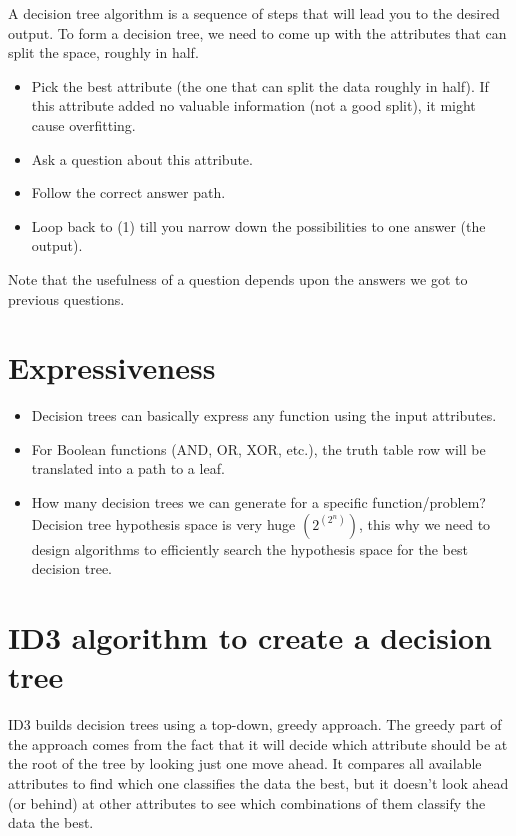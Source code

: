 \documentclass[12pt]{report}
\begin{document}
A decision tree algorithm is a sequence of steps that will lead you to the desired output. To form a decision tree, we need to come up with the attributes that can split the space, roughly in half. 
\begin{itemize}
\item Pick the best attribute (the one that can split the data roughly in half). If this attribute added no valuable information (not a good split), it might cause overfitting.
\item Ask a question about this attribute.
\item Follow the correct answer path.
\item Loop back to (1) till you narrow down the possibilities to one answer (the output).
\end{itemize}
Note that the usefulness of a question depends upon the answers we got to previous questions.



\section{Expressiveness}

\begin{itemize}
	\item Decision trees can basically express any function using the input attributes.
	\item For Boolean functions (AND, OR, XOR, etc.), the truth table row will be translated into a path to a leaf.
	\item How many decision trees we can generate for a specific function/problem? Decision tree hypothesis space is very huge $(2^{(2^{n})})$, this why we need to design algorithms to efficiently search the hypothesis space for the best decision tree. 
\end{itemize}

\section{ID3 algorithm to create a decision tree}
ID3 builds decision trees using a top-down, greedy approach. The greedy part of the approach comes from the fact that it will decide which attribute should be at the root of the tree by looking just one move ahead. It compares all available attributes to find which one classifies the data the best, but it doesn’t look ahead (or behind) at other attributes to see which combinations of them classify the data the best.
\end{document}
